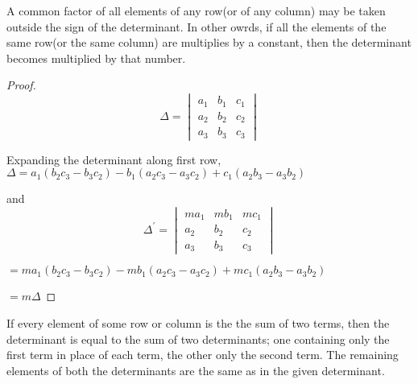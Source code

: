 \begin{theorem}
  A common factor of all elements of any row(or of any column) may be taken outside the sign of the determinant. In other owrds, if
  all the elements of the same row(or the same column) are multiplies by a constant, then the determinant becomes multiplied by
  that number.
\end{theorem}

\begin{proof}
  $$\Delta = \begin{vmatrix}a_1 & b_1 & c_1\\a_2 & b_2 & c_2\\ a_3 & b_3 & c_3\end{vmatrix}$$

Expanding the determinant along first row, $\Delta = a_1(b_2c_3 -
b_3c_2) - b_1(a_2c_3 - a_3c_2) + c_1(a_2b_3 - a_3b_2)$

and $$\Delta^{\prime} = \begin{vmatrix}ma_1 & mb_1 & mc_1\\a_2 & b_2 & c_2
\\ a_3 & b_3 & c_3\end{vmatrix}$$

$= ma_1(b_2c_3 - b_3c_2) - mb_1(a_2c_3 - a_3c_2) + mc_1(a_2b_3 - a_3b_2)$

$= m\Delta$
\end{proof}

\begin{theorem}
  If every element of some row or column is the the sum of two terms, then the determinant is equal to the sum of two determinants;
  one containing only the first term in place of each term, the other only the second term. The remaining elements of both the
  determinants are the same as in the given determinant.
\end{theorem}

